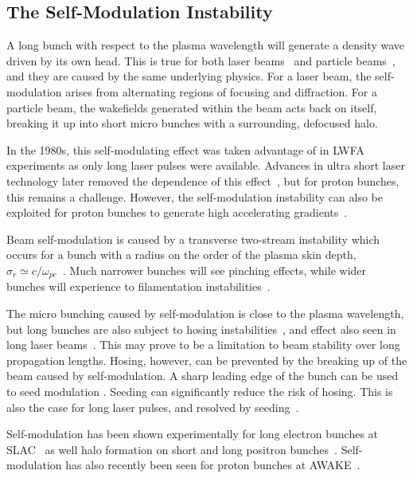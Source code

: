 \subsection{The Self-Modulation Instability}
\label{Int:DBeam:SMI}

A long bunch with respect to the plasma wavelength will generate a density wave driven by its own head. This is true for both laser beams~\cite{esarey:1994} and particle beams~\cite{kumar:2010}, and they are caused by the same underlying physics. For a laser beam, the self-modulation arises from alternating regions of focusing and diffraction. For a particle beam, the wakefields generated within the beam acts back on itself, breaking it up into short micro bunches with a surrounding, defocused halo.

In the 1980s, this self-modulating effect was taken advantage of in LWFA experiments as only long laser pulses were available. Advances in ultra short laser technology later removed the dependence of this effect~\cite{pukhov:2002}, but for proton bunches, this remains a challenge. However, the self-modulation instability can also be exploited for proton bunches to generate high accelerating gradients~\cite{schroeder:2012,schroeder:2011,caldwell:2009}.

Beam self-modulation is caused by a transverse two-stream instability which occurs for a bunch with a radius on the order of the plasma skin depth, $\sigma_{r} \simeq c/\omega_{pe}$~\cite{vieira:2012}. Much narrower bunches will see pinching effects, while wider bunches will experience to filamentation instabilities~\cite{keinigs:1987}.

The micro bunching caused by self-modulation is close to the plasma wavelength, but long bunches are also subject to hosing instabilities~\cite{whittum:1991}, and effect also seen in long laser beams~\cite{duda:1999,duda:2000}. This may prove to be a limitation to beam stability over long propagation lengths. Hosing, however, can be prevented by the breaking up of the beam caused by self-modulation. A sharp leading edge of the bunch can be used to seed modulation \cite{fang:2014}. Seeding can significantly reduce the risk of hosing. This is also the case for long laser pulses, and resolved by seeding~\cite{vieira:2012}. 

Self-modulation has been shown experimentally for long electron bunches at SLAC~\cite{muggli:2014,muggli:2015} as well halo formation on short and long positron bunches~\cite{muggli:2008,hogan:2003}. Self-modulation has also recently been seen for proton bunches at AWAKE~\cite{muggli:2017a}.

